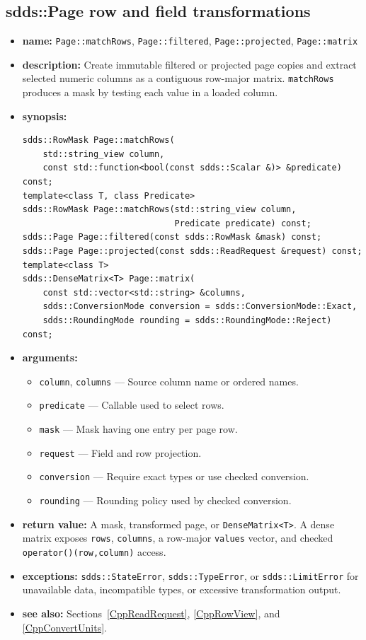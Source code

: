 \documentclass[11pt]{article}
\begin{document}
\subsection{sdds::Page row and field transformations}
\label{CppPageTransforms}

\begin{itemize}
\item {\bf name:}\newline
{\tt Page::matchRows}, {\tt Page::filtered}, {\tt Page::projected},
{\tt Page::matrix}
\item {\bf description:}\newline
Create immutable filtered or projected page copies and extract selected numeric
columns as a contiguous row-major matrix.  {\tt matchRows} produces a mask by
testing each value in a loaded column.
\item {\bf synopsis:}
\begin{verbatim}
sdds::RowMask Page::matchRows(
    std::string_view column,
    const std::function<bool(const sdds::Scalar &)> &predicate) const;
template<class T, class Predicate>
sdds::RowMask Page::matchRows(std::string_view column,
                              Predicate predicate) const;
sdds::Page Page::filtered(const sdds::RowMask &mask) const;
sdds::Page Page::projected(const sdds::ReadRequest &request) const;
template<class T>
sdds::DenseMatrix<T> Page::matrix(
    const std::vector<std::string> &columns,
    sdds::ConversionMode conversion = sdds::ConversionMode::Exact,
    sdds::RoundingMode rounding = sdds::RoundingMode::Reject) const;
\end{verbatim}
\item {\bf arguments:}
\begin{itemize}
\item {\tt column}, {\tt columns} --- Source column name or ordered names.
\item {\tt predicate} --- Callable used to select rows.
\item {\tt mask} --- Mask having one entry per page row.
\item {\tt request} --- Field and row projection.
\item {\tt conversion} --- Require exact types or use checked conversion.
\item {\tt rounding} --- Rounding policy used by checked conversion.
\end{itemize}
\item {\bf return value:}\newline
A mask, transformed page, or {\tt DenseMatrix<T>}.  A dense matrix exposes
{\tt rows}, {\tt columns}, a row-major {\tt values} vector, and checked
{\tt operator()(row,column)} access.
\item {\bf exceptions:}\newline
{\tt sdds::StateError}, {\tt sdds::TypeError}, or {\tt sdds::LimitError} for
unavailable data, incompatible types, or excessive transformation output.
\item {\bf see also:}\newline
Sections~\ref{CppReadRequest}, \ref{CppRowView}, and \ref{CppConvertUnits}.
\end{itemize}
\end{document}
